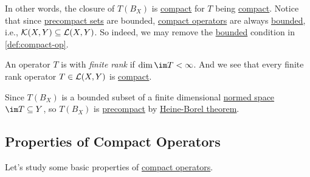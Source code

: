 In other words, the closure of \(T(B_X)\) is \hyperref[def:compact]{compact} for \(T\) being \hyperref[def:compact-op]{compact}. Notice that since \hyperref[def:precompact]{precompact sets} are bounded, \hyperref[def:compact-op]{compact operators} are always \hyperref[def:bounded-map]{bounded}, i.e., \(\mathcal{\MakeUppercase{K}} (X, Y)\subseteq \mathcal{\MakeUppercase{l}} (X, Y)\). So indeed, we may remove the \hyperref[def:bounded-map]{bounded} condition in \autoref{def:compact-op}.

\begin{remark}\label{rmk:finite-rank-op}
	An operator \(T\) is with \emph{finite rank} if \(\dim \im T < \infty \). And we see that every finite rank operator \(T\in \mathcal{\MakeUppercase{l}} (X, Y)\) is \hyperref[def:compact-op]{compact}.
\end{remark}
\begin{explanation}
	Since \(T(B_X)\) 	is a bounded subset of a finite dimensional \hyperref[def:normed-vector-space]{normed space} \(\im T \subseteq Y\), so \(T(B_X)\) is \hyperref[def:precompact]{precompact} by \hyperref[thm:Heine-Borel]{Heine-Borel theorem}.
\end{explanation}

\subsection{Properties of Compact Operators}
Let's study some basic properties of \hyperref[def:compact-op]{compact operators}.

